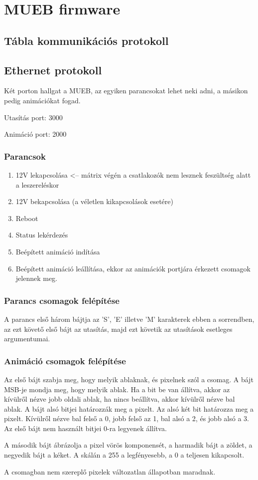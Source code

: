 \chapter{MUEB firmware}

\section{Tábla kommunikációs protokoll}
\section{Ethernet protokoll}
Két porton hallgat a MUEB, az egyiken parancsokat lehet neki adni, a másikon pedig animációkat fogad.
\par
Utasítás port: 3000
\par
Animáció port: 2000

\subsection{Parancsok}
\begin{enumerate}
  \item 12V lekapcsolása <-- mátrix végén a csatlakozók nem lesznek feszültség alatt a leszereléskor
  \item 12V bekapcsolása (a véletlen kikapcsolások esetére)
  \item Reboot
  \item Status lekérdezés
  \item Beépített animáció indítása
  \item Beépített animáció leállítása, ekkor az animációk portjára érkezett csomagok jelennek meg.
\end{enumerate}
\subsection{Parancs csomagok felépítése}
A parancs első három bájtja az 'S', 'E' illetve 'M' karakterek ebben a sorrendben, az ezt követő első bájt az utasítás, majd ezt követik az utasítások esetleges argumentumai. 
\subsection{Animáció csomagok felépítése}
Az első bájt szabja meg, hogy melyik ablaknak, és pixelnek szól a csomag. A bájt MSB-je mondja meg, hogy melyik ablak. Ha a bit be van állítva, akkor az kívülről nézve jobb oldali ablak, ha nincs beállítva, akkor kívülről nézve bal ablak. A bájt alsó bitjei határozzák meg a pixelt. Az alsó két bit határozza meg a pixelt. Kívülről nézve bal felső a 0, jobb felső az 1, bal alsó a 2, és jobb alsó a 3. Az első bájt nem használt bitjei 0-ra legyenek állítva. 
\par
A második bájt ábrázolja a pixel vörös komponensét, a harmadik bájt a zöldet, a negyedik bájt a kéket. A skálán a 255 a legfényesebb, a 0 a teljesen kikapcsolt.
\par
A csomagban nem szereplő pixelek változatlan állapotban maradnak.
